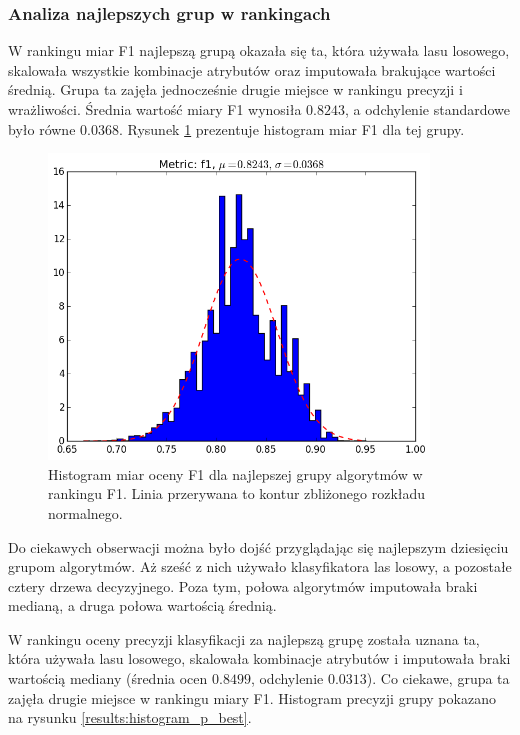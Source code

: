 \documentclass[../thesis.tex]{subfiles}
\begin{document}
\subsubsection{Analiza najlepszych grup w rankingach}

W rankingu miar F1 najlepszą grupą okazała się ta, która używała lasu losowego, skalowała wszystkie kombinacje atrybutów oraz imputowała brakujące wartości średnią. Grupa ta zajęła jednocześnie drugie miejsce w rankingu precyzji i wrażliwości. Średnia wartość miary F1 wynosiła $0.8243$, a odchylenie standardowe było równe $0.0368$. Rysunek \ref{results:histogram_f1_best} prezentuje histogram miar F1 dla tej grupy.

\begin{figure}[h]
\centering
\includegraphics[width=0.9\textwidth]{10-f1.png}
\caption{Histogram miar oceny F1 dla najlepszej grupy algorytmów w rankingu F1. Linia przerywana to kontur zbliżonego rozkładu normalnego.}
\label{results:histogram_f1_best}
\end{figure}

Do ciekawych obserwacji można było dojść przyglądając się najlepszym dziesięciu grupom algorytmów. Aż sześć z nich używało klasyfikatora las losowy, a pozostałe cztery drzewa decyzyjnego. Poza tym, połowa algorytmów imputowała braki medianą, a druga połowa wartością średnią. 

W rankingu oceny precyzji klasyfikacji za najlepszą grupę została uznana ta, która używała lasu losowego, skalowała kombinacje atrybutów i imputowała braki wartością mediany (średnia ocen $0.8499$, odchylenie $0.0313$). Co ciekawe, grupa ta zajęła drugie miejsce w rankingu miary F1. Histogram precyzji grupy pokazano na rysunku \ref{results:histogram_p_best}.
\end{document}
